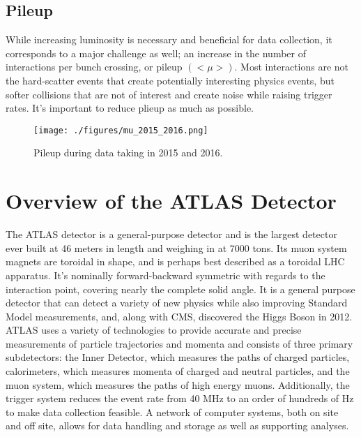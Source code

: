 
\subsection{Pileup}

While increasing luminosity is necessary and beneficial for data collection, it corresponds to a major challenge as well; an increase in the number of interactions per bunch crossing, or pileup $(<\mu>)$.  Most interactions are not the hard-scatter events that create potentially interesting physics events, but softer collisions that are not of interest and create noise while raising trigger rates.  It's important to reduce plieup as much as possible. \\%

\begin{figure}[h!]
  \centering
	\texttt{[image: ./figures/mu\_2015\_2016.png]}
\caption{\label{fig:mu}{ Pileup during data taking in 2015 and 2016. }} %
\end{figure}

\section{Overview of the ATLAS Detector}
The ATLAS detector is a general-purpose detector and is the largest detector ever built at 46 meters in length and weighing in at 7000 tons.  Its muon system magnets are toroidal in shape, and is perhaps best described as a toroidal LHC apparatus.  It's nominally forward-backward symmetric with regards to the interaction point, covering nearly the complete solid angle.  It is a general purpose detector that can detect a variety of new physics while also improving Standard Model measurements, and, along with CMS, discovered the Higgs Boson in 2012.  \\

ATLAS uses a variety of technologies to provide accurate and precise measurements of particle trajectories and momenta and consists of three primary subdetectors: the Inner Detector, which measures the paths of charged particles, calorimeters, which measures momenta of charged and neutral particles, and the muon system, which measures the paths of high energy muons.  Additionally, the trigger system reduces the event rate from 40 MHz to an order of hundreds of Hz to make data collection feasible.  A network of computer systems, both on site and off site, allows for data handling and storage as well as supporting analyses.\\

